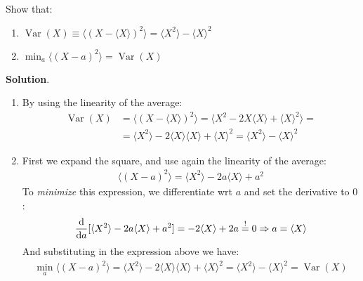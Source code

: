 \documentclass[../../main.tex]{subfiles}
\begin{document}
\begin{exo}
    Show that:
    \begin{enumerate}
        \item $\operatorname{Var}(X) \equiv \langle (X-\langle X \rangle)^2 \rangle = \langle X^2 \rangle - \langle X \rangle^2$
        \item $\displaystyle \min_a \langle (X-a)^2 \rangle = \operatorname{Var}(X)$ 
    \end{enumerate}
    
    \medskip

    \textbf{Solution}.
    \begin{enumerate}
        \item By using the linearity of the average:
        \begin{align*}
            \operatorname{Var}(X) &= \langle (X - \langle X \rangle)^2 \rangle = \langle X^2 -  2 X \langle X \rangle + \langle X \rangle^2\rangle = \\
            &=\langle X^2 \rangle - 2 \langle X \rangle \langle X \rangle + \langle X \rangle^2 = \langle X^2 \rangle - \langle X \rangle^2
        \end{align*}
        \item First we expand the square, and use again the linearity of the average:
        \begin{align*}
            \langle (X-a)^2 \rangle = \langle X^2 \rangle - 2a \langle X \rangle + a^2
        \end{align*}
        To \textit{minimize} this expression, we differentiate wrt $a$ and set the derivative to $0$:
        \begin{align*}
            \dv{a} [\langle X^2 \rangle -2a \langle X \rangle + a^2] = -2 \langle X \rangle + 2a \overset{!}{=} 0 \Rightarrow a = \langle X \rangle
        \end{align*} 
        And substituting in the expression above we have:
        \begin{align*}
            \min_a \langle (X-a)^2 \rangle = \langle X^2 \rangle - 2 \langle X \rangle \langle X \rangle + \langle X \rangle^2 = \langle X^2 \rangle-\langle X \rangle^2 = \operatorname{Var}(X) 
        \end{align*}
    \end{enumerate}
\end{exo}
\end{document}
